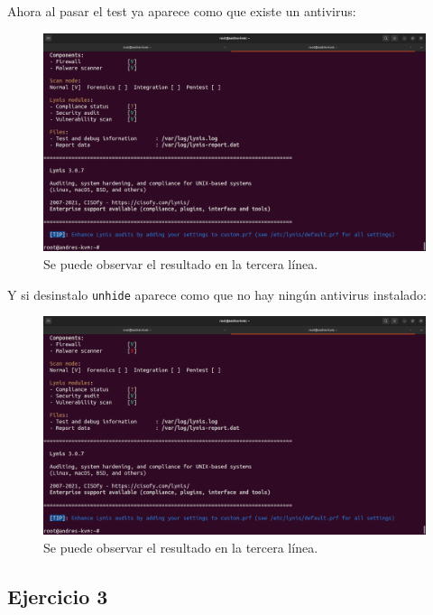 \documentclass{article}
\begin{document}
\newpage

Ahora al pasar el test ya aparece como que existe un antivirus:

\begin{figure}[H]
    \includegraphics[width=\textwidth]{imagenes/lynisok.png}
    \caption{Se puede observar el resultado en la tercera línea.}
\end{figure}

\bigskip

Y si desinstalo \verb|unhide| aparece como que no hay ningún antivirus instalado:

\begin{figure}[H]
    \includegraphics[width=\textwidth]{imagenes/lynisnook.png}
    \caption{Se puede observar el resultado en la tercera línea.}
\end{figure}


\newpage

\subsection*{Ejercicio 3}
\end{document}
